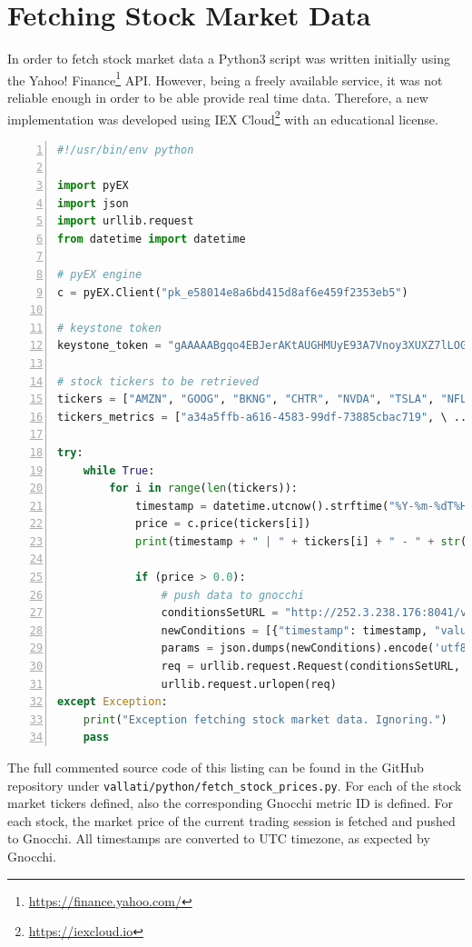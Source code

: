 \documentclass[11pt,a4paper]{article}
\begin{document}
\section{Fetching Stock Market Data}
In order to fetch stock market data a Python3 script was written initially using the Yahoo! Finance\footnote{\url{https://finance.yahoo.com/}} API. However, being a freely available service, it was not reliable enough in order to be able provide real time data. Therefore, a new implementation was developed using IEX Cloud\footnote{\url{https://iexcloud.io}} with an educational license.
\begin{lstlisting}[language=python,caption={fetch\_stock\_prices.py},numbers=left]
#!/usr/bin/env python

import pyEX
import json
import urllib.request
from datetime import datetime

# pyEX engine
c = pyEX.Client("pk_e58014e8a6bd415d8af6e459f2353eb5")

# keystone token
keystone_token = "gAAAAABgqo4EBJerAKtAUGHMUyE93A7Vnoy3XUXZ7lLOGLXki_qXc..."

# stock tickers to be retrieved
tickers = ["AMZN", "GOOG", "BKNG", "CHTR", "NVDA", "TSLA", "NFLX", ...];
tickers_metrics = ["a34a5ffb-a616-4583-99df-73885cbac719", \ ...]

try:
    while True:
        for i in range(len(tickers)):
            timestamp = datetime.utcnow().strftime("%Y-%m-%dT%H:%M:%S")
            price = c.price(tickers[i])
            print(timestamp + " | " + tickers[i] + " - " + str(price))

            if (price > 0.0):
                # push data to gnocchi
                conditionsSetURL = "http://252.3.238.176:8041/v1/metric/" ...
                newConditions = [{"timestamp": timestamp, "value": ...
                params = json.dumps(newConditions).encode('utf8')
                req = urllib.request.Request(conditionsSetURL, data= ...
                urllib.request.urlopen(req)
except Exception:
    print("Exception fetching stock market data. Ignoring.")
    pass
\end{lstlisting}
The full commented source code of this listing can be found in the GitHub repository under \texttt{vallati/python/fetch\_stock\_prices.py}. For each of the stock market tickers defined, also the corresponding Gnocchi metric ID is defined. For each stock, the market price of the current trading session is fetched and pushed to Gnocchi. All timestamps are converted to UTC timezone, as expected by Gnocchi.
\end{document}
